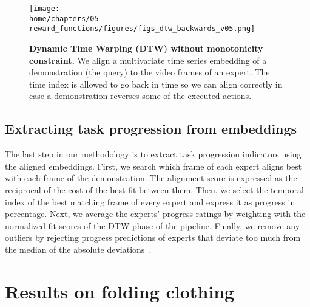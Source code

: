 \documentclass[\home/main.tex]{subfiles}
\begin{document}
\begin{figure}[htbp]
    \centering
    \texttt{[image: \\home/chapters/05-reward\_functions/figures/figs\_dtw\_backwards\_v05.png]}
    \caption{\textbf{Dynamic Time Warping (DTW) without monotonicity constraint.} We align a multivariate time series embedding of a demonstration (the query) to the video frames of an expert. The time index is allowed to go back in time so we can align correctly in case a demonstration reverses some of the executed actions.}
    \label{fig:dtw}
\end{figure}

\subsection{Extracting task progression from embeddings} \label{subsec:extract}
The last step in our methodology is to extract task progression indicators using the aligned embeddings. First, we search which frame of each expert aligns best with each frame of the demonstration. The alignment score is expressed as the reciprocal of the cost of the best fit between them. Then, we select the temporal index of the best matching frame of every expert and express it as progress in percentage. Next, we average the experts' progress ratings by weighting with the normalized fit scores of the DTW phase of the pipeline. Finally, we remove any outliers by rejecting progress predictions of experts that deviate too much from the median of the absolute deviations~\cite{Leys2013}. %




\section{Results on folding clothing}\label{sec:results}
\end{document}
